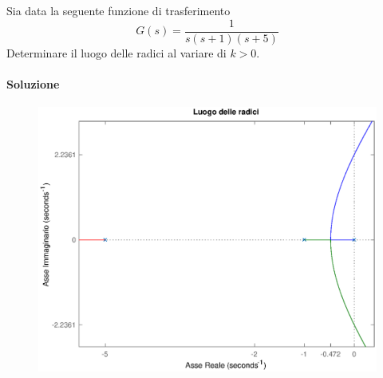 \exercise{}
Sia data la seguente funzione di trasferimento
\[
	G(s) = \frac{1}{s(s+1)(s+5)}
\]
Determinare il luogo delle radici al variare di \(k>0\).

\paragraph{Soluzione}

\begin{figure}[ht]
	\centering
	\includegraphics[scale=.6]{mod1/assets/rl_ex33}
\end{figure}

